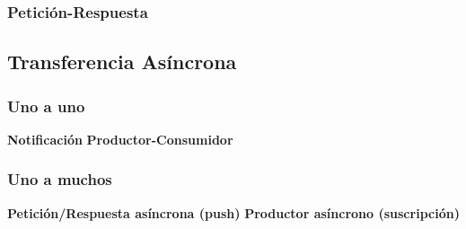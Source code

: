 \subsubsection{Petición-Respuesta}

\subsection{Transferencia Asíncrona}

\subsubsection{Uno a uno}
\textbf{Notificación}
\textbf{Productor-Consumidor}

\subsubsection{Uno a muchos}
\textbf{Petición/Respuesta asíncrona (push)}
\textbf{Productor asíncrono (suscripción)}

